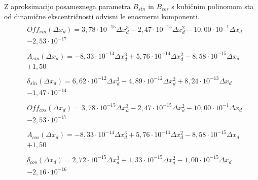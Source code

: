 Z aproksimacijo posameznega parametra $B_{sin}$ in $B_{cos}$ s kubičnim polinomom sta od dinamične ekscentričnosti odvisni le enosmerni komponenti.
\begin{eqnarray}
\label{analog_lin_xd}
&\begin{split}Off_{sin}(\Delta x_d) =3,78\cdot 10^{-15}\Delta x_d^{3}-2,47\cdot 10^{-15}\Delta x_d^{2}-10,00\cdot 10^{-1}\Delta x_d\\-2,53\cdot 10^{-17} \end{split}\\   
&\begin{split}A_{sin}(\Delta x_d) =-8,33\cdot 10^{-14}\Delta x_d^{3}+5,76\cdot 10^{-14}\Delta x_d^{2}-8,58\cdot 10^{-15}\Delta x_d\\+1,50\end{split} \\                  
&\begin{split}\delta_{sin}(\Delta x_d) =6,62\cdot 10^{-12}\Delta x_d^{3}-4,89\cdot 10^{-12}\Delta x_d^{2}+8,24\cdot 10^{-13}\Delta x_d \\ -1,47\cdot 10^{-14}\end{split}\\      
&\begin{split}Off_{cos}(\Delta x_d) =3,78\cdot 10^{-15}\Delta x_d^{3}-2,47\cdot 10^{-15}\Delta x_d^{2}-10,00\cdot 10^{-1}\Delta x_d\\-2,53\cdot 10^{-17} \end{split}\\   
&\begin{split}A_{cos}(\Delta x_d) =-8,33\cdot 10^{-14}\Delta x_d^{3}+5,76\cdot 10^{-14}\Delta x_d^{2}-8,58\cdot 10^{-15}\Delta x_d\\+1,50 \end{split}\\                  
&\begin{split}\delta_{cos}(\Delta x_d) =2,72\cdot 10^{-15}\Delta x_d^{3}+1,33\cdot 10^{-15}\Delta x_d^{2}-1,00\cdot 10^{-15}\Delta x_d\\-2,16\cdot 10^{-16}\end{split}
\end{eqnarray}
